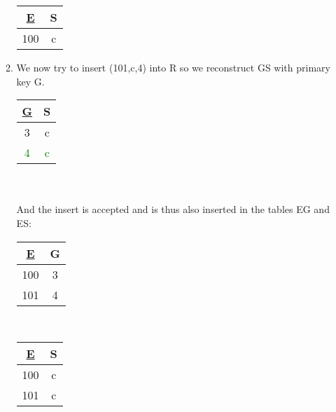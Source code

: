 \documentclass[9pt]{article}
\begin{document}
\begin{enumerate}
\begin{enumerate}
\begin{tabular}{|c|c|}
            \underline{E} & S \\
            \hline
            100 & c \\ 
            \hline
        \end{tabular}
        \item We now try to insert (101,c,4) into R so we reconstruct GS with primary key G.
        \\
        \begin{tabular}{|c|c|} 
            \hline
            \underline{G} & S \\
            \hline
            3 & c \\ 
            \textcolor{green}{4} & \textcolor{green}{c} \\
            \hline
        \end{tabular}
        \\\\ And the insert is accepted and is thus also inserted in the tables EG and ES:
        \\
        \begin{tabular}{|c|c|} 
            \hline
            \underline{E} & G \\
            \hline
            100 & 3 \\ 
            101 & 4 \\
            \hline
        \end{tabular}
        \ \ \ \ \ \ \ \ \ \ \ \ \ \ \ \ 
        \begin{tabular}{|c|c|} 
            \hline
            \underline{E} & S \\
            \hline
            100 & c \\ 
            101 & c \\ 
            \hline
        \end{tabular}
    \end{enumerate}
\end{enumerate}
\end{document}
